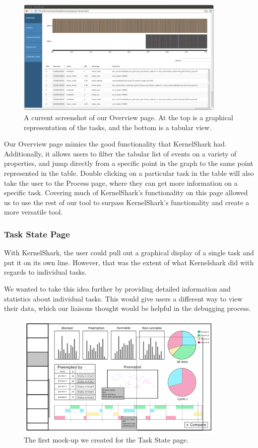 \documentclass{hmcclinic}
\begin{document}
\begin{figure}
\begin{center}
\includegraphics[width=4in]{overview-page.png}
\caption{A current screenshot of our Overview page. At the top is a graphical
representation of the tasks, and the bottom is a tabular view.}
\end{center}
\end{figure}

Our Overview page mimics the good
functionality that KernelShark had. Additionally, it allows users to filter the
tabular list of events on a variety of properties, and jump directly from a
specific point in the graph to the same point represented in the table. Double
clicking on a particular task in the table will also take the user to the
Process page, where they can get more information on a specific task. Covering
much of KernelShark's functionality on this page allowed us to use the rest of
our tool to surpass KernelShark's functionality and create a more versatile
tool.

\subsubsection{Task State Page}

With KernelShark, the user could pull out a graphical display of a single
task and put it on its own line. However, that was the extent of what
Kernelshark did with regards to individual tasks.

We wanted to take this idea further by providing detailed information and
statistics about individual tasks. This would give users a different way to view
their data, which our liaisons thought would be helpful
in the debugging process.

\begin{figure}
\begin{center}
\includegraphics[width=4in]{perProcess-49.png}
\caption{The first mock-up we created for the Task State page.}
\end{center}
\end{figure}
\end{document}
